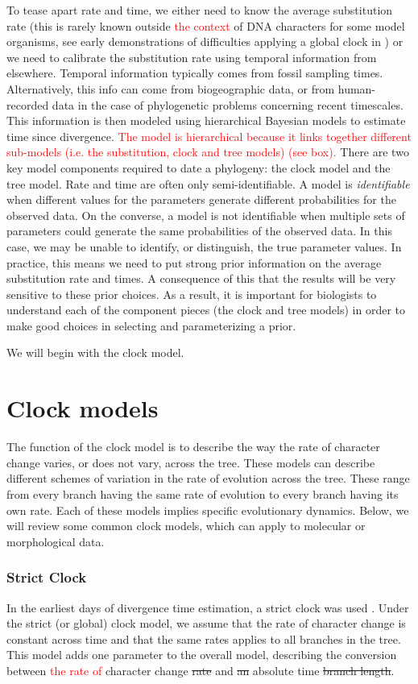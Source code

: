 \documentclass[11pt]{article}
\newcommand{\edit}[1]{{\textcolor{red}{#1}}} %
\begin{document}
To tease apart rate and time, we either need to know the average substitution rate (this is rarely known outside \edit{the context} of DNA characters for some model organisms, see early demonstrations of difficulties applying a global clock in \cite{gaut1992, MOOERS1994, bromham1996, rambaut1998}) or we need to calibrate the substitution rate using temporal information from elsewhere.
Temporal information typically comes from  fossil sampling times.
Alternatively, this info can come from biogeographic data, or from human-recorded data in the case of phylogenetic problems concerning recent timescales.
This information is then modeled using hierarchical  Bayesian models to estimate time since divergence.
\edit{The model is hierarchical because it links together different sub-models (i.e. the substitution, clock and tree models) (see box).}
There are two key model components required to date a phylogeny: the clock model and the tree model.
Rate and time are often only semi-identifiable.
A model is \textit{identifiable} when different values for the parameters generate different probabilities for the observed data.
On the converse, a model is not identifiable when multiple sets of parameters could generate the same probabilities of the observed data.
In this case, we may be unable to identify, or distinguish, the true parameter values.
In practice, this means we need to put strong prior information on the average substitution rate and times. 
A consequence of this that the results will be very sensitive to these prior choices.
As a result, it is important for biologists to understand each of the component pieces (the clock and tree models) in order to make good choices in selecting and parameterizing a prior.

We will begin with the clock model.


\section{Clock models}
The function of the clock model is to describe the way the rate of character change varies, or does not vary, across the tree.
These models can describe different schemes of variation in the rate of evolution across the tree.
These range from  every branch having the same rate of evolution to every branch having its own rate.
Each of these models implies specific evolutionary dynamics.
Below, we will review some common clock models, which can apply to molecular or morphological data.

\subsubsection{Strict Clock}
In the earliest days of divergence time estimation, a strict clock was used \cite{Zuckerkandl1962, Zuckerkandl1965EvolutionaryDivergenceConvergence}.
Under the strict (or global) clock model, we assume that the rate of character change is constant across time and that the same rates applies to all branches in the tree.
This model adds one parameter to the overall model, describing the conversion between \edit {the rate of} character change \sout{rate} and \sout{an} absolute time \sout{branch length}.
\end{document}
